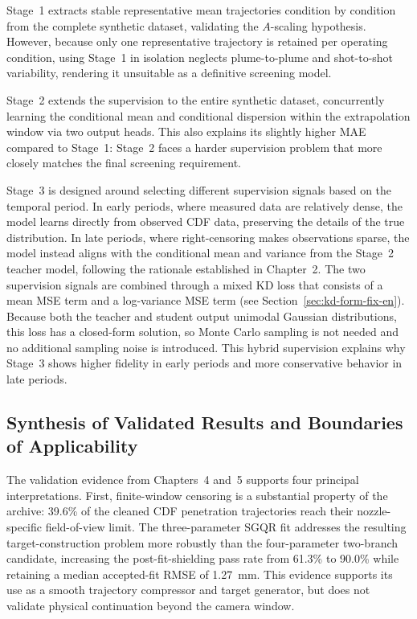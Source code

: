 Stage~1 extracts stable representative mean trajectories condition by condition from the complete synthetic dataset, validating the $A$-scaling hypothesis.
However, because only one representative trajectory is retained per operating condition, using Stage~1 in isolation neglects plume-to-plume and shot-to-shot variability, rendering it unsuitable as a definitive screening model.

Stage~2 extends the supervision to the entire synthetic dataset, concurrently learning the conditional mean and conditional dispersion within the extrapolation window via two output heads.
This also explains its slightly higher MAE compared to Stage~1: Stage~2 faces a harder supervision problem that more closely matches the final screening requirement.

Stage~3 is designed around selecting different supervision signals based on the temporal period.
In early periods, where measured data are relatively dense, the model learns directly from observed CDF data, preserving the details of the true distribution.
In late periods, where right-censoring makes observations sparse, the model instead aligns with the conditional mean and variance from the Stage~2 teacher model, following the rationale established in Chapter~2.
The two supervision signals are combined through a mixed KD loss that consists of a mean MSE term and a log-variance MSE term (see Section~\ref{sec:kd-form-fix-en}).
Because both the teacher and student output unimodal Gaussian distributions, this loss has a closed-form solution, so Monte Carlo sampling is not needed and no additional sampling noise is introduced.
This hybrid supervision explains why Stage~3 shows higher fidelity in early periods and more conservative behavior in late periods.

\subsection{Synthesis of Validated Results and Boundaries of Applicability}

The validation evidence from Chapters~4 and~5 supports four principal interpretations.
First, finite-window censoring is a substantial property of the archive: 39.6\% of the cleaned CDF penetration trajectories reach their nozzle-specific field-of-view limit.
The three-parameter \(\mathrm{SGQR}\) fit addresses the resulting target-construction problem more robustly than the four-parameter two-branch candidate, increasing the post-fit-shielding pass rate from 61.3\% to 90.0\% while retaining a median accepted-fit RMSE of \SI{1.27}{mm}.
This evidence supports its use as a smooth trajectory compressor and target generator, but does not validate physical continuation beyond the camera window.

